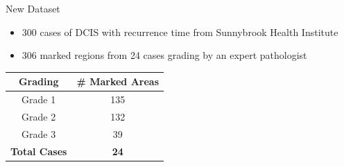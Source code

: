 \documentclass[usenames,dvipsnames]{beamer}
\begin{document}
\begin{frame}{New Dataset}

\begin{itemize}
\item 300 cases of DCIS with  recurrence time from Sunnybrook Health Institute
\item 306 marked regions from 24 cases grading by an expert pathologist 
\end{itemize}
    \begin{table}[]
\begin{tabular}{|c|c|}
\hline
Grading              & \# Marked Areas \\ \hline
Grade 1              & 135             \\ \hline
Grade 2              & 132             \\ \hline
Grade 3              & 39              \\ \hline\hline
\textbf{Total Cases} & \textbf{24}     \\ \hline
\end{tabular}
\end{table}
\end{frame}


%
%
%
%
%    
%
%
%
%
\end{document}

